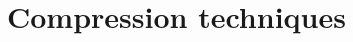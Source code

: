 \begin{comment}
  
\end{comment}

\chapter{Compression techniques}
\label{cha:digital-image}

\printbibliography[heading=subbibliography]
